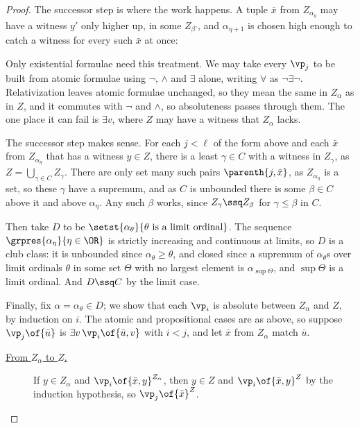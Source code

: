 \begin{proof}
    The successor step is where the work happens. A tuple $\bar{x}$ from $Z_{\alpha_{\eta}}$ may have a witness $y'$ only higher up, in some $Z_{\beta'}$, and $\alpha_{\eta + 1}$ is chosen high enough to catch a witness for every such $\bar{x}$ at once:
    \begin{figure}[H]
        \centering
    \end{figure}
    Only existential formulae need this treatment. We may take every $\vp_j$ to be built from atomic formulae using $\neg$, $\land$ and $\exists$ alone, writing $\forall$ as $\neg \exists \neg$. Relativization leaves atomic formulae unchanged, so they mean the same in $Z_{\alpha}$ as in $Z$, and it commutes with $\neg$ and $\land$, so absoluteness passes through them. The one place it can fail is $\exists v$, where $Z$ may have a witness that $Z_{\alpha}$ lacks.

    The successor step makes sense. For each $j < \ell$ of the form above and each $\bar{x}$ from $Z_{\alpha_{\eta}}$ that has a witness $y \in Z$, there is a least $\gamma \in C$ with a witness in $Z_{\gamma}$, as $Z = \bigcup_{\gamma \in C} Z_{\gamma}$. There are only set many such pairs $\parenth{j, \bar{x}}$, as $Z_{\alpha_{\eta}}$ is a set, so these $\gamma$ have a supremum, and as $C$ is unbounded there is some $\beta \in C$ above it and above $\alpha_{\eta}$. Any such $\beta$ works, since $Z_{\gamma} \ssq Z_{\beta}$ for $\gamma \leq \beta$ in $C$.

    Then take $D$ to be $\setst{\alpha_{\theta}}{\theta \text{ is a limit ordinal}}$. The sequence $\grpres{\alpha_{\eta}}{\eta \in \OR}$ is strictly increasing and continuous at limits, so $D$ is a club class: it is unbounded since $\alpha_{\theta} \geq \theta$, and closed since a supremum of $\alpha_{\theta}$s over limit ordinals $\theta$ in some set $\Theta$ with no largest element is $\alpha_{\sup \Theta}$, and $\sup \Theta$ is a limit ordinal. And $D \ssq C$ by the limit case.

    Finally, fix $\alpha = \alpha_{\theta} \in D$; we show that each $\vp_i$ is absolute between $Z_{\alpha}$ and $Z$, by induction on $i$. The atomic and propositional cases are as above, so suppose $\vp_j\of{\bar{u}}$ is $\exists v \, \vp_i\of{\bar{u}, v}$ with $i < j$, and let $\bar{x}$ from $Z_{\alpha}$ match $\bar{u}$.
    \begin{description}
        \item[\underline{From $Z_{\alpha}$ to $Z$.}] If $y \in Z_{\alpha}$ and $\vp_i\of{\bar{x}, y}^{Z_{\alpha}}$, then $y \in Z$ and $\vp_i\of{\bar{x}, y}^Z$ by the induction hypothesis, so $\vp_j\of{\bar{x}}^Z$.


\end{description}
\end{proof}
